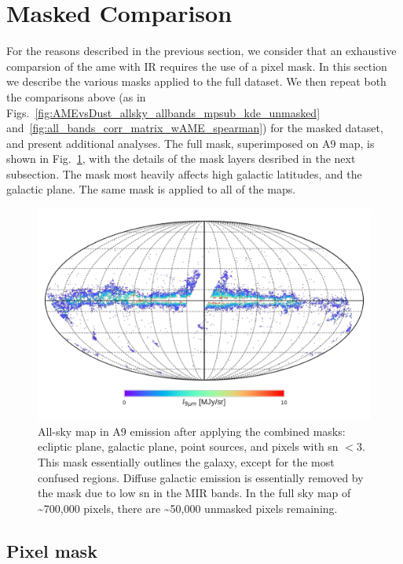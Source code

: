       \section{Masked Comparison}
        For the reasons described in the previous section, we consider that an exhaustive comparsion of the \acrshort{ame} with IR requires the use of a pixel mask. In this section we describe the various masks applied to the full dataset. We then repeat both the comparisons above (as in  Figs.~\ref{fig:AMEvsDust_allsky_allbands_mpsub_kde_unmasked} and~\ref{fig:all_bands_corr_matrix_wAME_spearman}) for the masked dataset, and present additional analyses. The full mask, superimposed on A9 map, is shown in Fig.~\ref{fig:A9_masked_map}, with the details of the mask layers desribed in the next subsection. The mask most heavily affects high galactic latitudes, and the galactic plane. The same mask is applied to all of the maps.
          \begin{figure}
            \includegraphics[width=\textwidth]{../Plots/ch_allsky/masked_map_A9.pdf}
            \centering
            \caption{All-sky map in A9 emission after applying the combined masks: ecliptic plane, galactic plane, point sources, and pixels with \acrshort{sn} $<3$. This mask essentially outlines the galaxy, except for the most confused regions. Diffuse galactic emission is essentially removed by the mask due to low \acrshort{sn} in the MIR bands. In the full sky map of \textasciitilde{}700,000 pixels, there are \textasciitilde{}50,000 unmasked pixels remaining.}
            \label{fig:A9_masked_map}
          \end{figure}

      \subsection{Pixel mask}
      \label{sec:pixmask}
